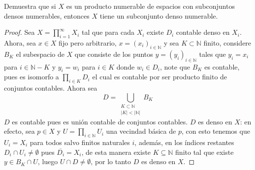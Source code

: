 
 \item Demuestra que si $X$ es un producto numerable de espacios con subconjuntos densos numerables, entonces $X$ tiene un subconjunto denso numerable.

\begin{proof}
    Sea $X=\displaystyle{\prod_{i=1}^{\infty}}X_i$ tal que para cada $X_i$ existe $D_i$ contable denso en $X_i$.
    Ahora, sea $x \in X$ fijo pero arbitrario, $x = (x_i)_{i\in \mathbb{N}}$ y sea $K \subset \mathbb{N}$ finito, considere $B_K$ el subespacio de $X$ que consiste de los puntos $y = (y_i)_{i\in \mathbb{N}}$ tales que $y_i=x_i$ para $i \in \mathbb{N} - K$ y $y_i = w_i$ para $i \in K$ donde $w_i \in D_i$, note que $B_K$ es contable, pues es isomorfo a $\displaystyle{\prod_{i \in K}} D_i$ el cual es contable por ser producto finito de conjuntos contables. Ahora sea
     $$D = \displaystyle \bigcup_{\substack{K \subset \mathbb{N} \\ |K| < |\mathbb{N}|}} B_K $$
     $D$ es contable pues es unión contable de conjuntos contables. $D$ es denso en $X$: en efecto, sea $p \in X$ y $U = \displaystyle{\prod_{i \in \mathbb{N}}} U_i$ una vecindad básica de $p$, con esto tenemos que $U_i= X_i$ para todos salvo finitos naturales $i$, además, en los índices restantes $D_i \cap U_i \neq \emptyset$ pues $\overline{D_i}=X_i$, de esta manera existe $K \subseteq \mathbb{N}$ finito tal que existe $y \in B_K \cap U$, luego $U \cap D \neq \emptyset$, por lo tanto $D$ es denso en $X$.
\end{proof}